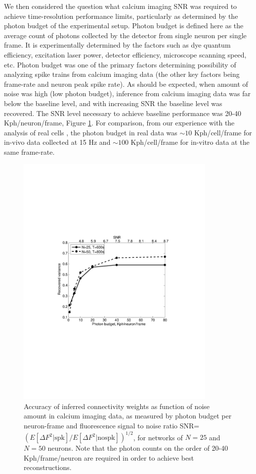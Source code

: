 We then considered the question what calcium imaging SNR was required to achieve time-resolution performance limits, particularly as determined by the photon budget of the experimental setup. Photon budget is defined here as the average count of photons collected by the detector from single neuron per single frame. It is experimentally determined by the factors such as dye quantum efficiency, excitation laser power, detector efficiency, microscope scanning speed, etc. Photon budget was one of the primary factors determining possibility of analyzing spike trains from calcium imaging data (the other key factors being frame-rate and neuron peak spike rate).  As should be expected, when amount of noise was high (low photon budget), inference from calcium imaging data was far below the baseline level, and with increasing SNR the baseline level was recovered. The SNR level necessary to achieve baseline performance was 20-40 Kph/neuron/frame, Figure \ref{fig:ca-noise}.  For comparison, from our experience with the analysis of real cells \cite{Vogelstein2009}, the photon budget in real data was $\sim 10$ Kph/cell/frame for in-vivo data collected at 15  Hz and $\sim 100$ Kph/cell/frame for in-vitro data at the same frame-rate.

\begin{figure}
\includegraphics[width=275pt]{../figs/Figure3_perf_vs_gamma}
\caption{Accuracy of inferred connectivity weights as function of noise amount in
calcium imaging data, as measured by photon budget per neuron-frame and fluorescence
signal to noise ratio
SNR=$\left({E[\Delta F^2 | \text{spk}]}/{E[\Delta F^2|\text{nospk}]}\right)^{1/2}$, 
for networks of $N=25$ and $N=50$ neurons. Note that the photon counts on the order of 20-40 Kph/frame/neuron are required in order to achieve best reconstructions.}
\label{fig:ca-noise}
\end{figure}

